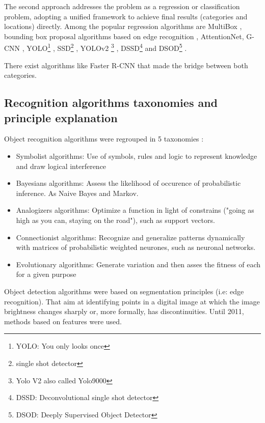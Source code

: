 \documentclass[10pt]{article}
\begin{document}
The second approach addresses the problem as a regression or classiﬁcation problem, adopting a uniﬁed framework to achieve ﬁnal results (categories and locations) directly. Among the popular regression algorithms are MultiBox \cite{erhan2014scalable}, bounding box proposal algorithms based on edge recognition \cite{zitnick2014edge}, AttentionNet\cite{yoo2015attentionnet}, G-CNN \cite{najibi2016g}, YOLO\footnote{YOLO: You only looks once} \cite{redmon2016you}, SSD\footnote{single shot detector} \cite{liu2016ssd}, YOLOv2 \footnote{Yolo V2 also called Yolo9000} \cite{redmon2017yolo9000}, DSSD\footnote{DSSD: Deconvolutional single shot detector} \cite{fu2017dssd} and DSOD\footnote{DSOD:  Deeply Supervised Object Detector} \cite{shen2017dsod}.

There exist algorithms like Faster R-CNN that made the bridge between both categories.

\subsection{Recognition algorithms taxonomies and principle explanation }

Object recognition algorithms were regrouped in 5 taxonomies \cite{domingos2015master}: 
\begin{itemize}
    \item Symbolist algorithms: Use of symbols, rules and logic to represent knowledge and draw logical interference 
    \item Bayesians algorithms: Assess the likelihood of occurence of probabilistic inference. As Naive Bayes and Markov. 
    \item Analogizers algorithms: Optimize a function in light of constrains ("going as high as you can, staying on the road"), such as support vectors.
    \item Connectionist algorithms: Recognize and generalize patterns dynamically with matrices of probabilistic weighted neurones, such as neuronal networks.
    \item Evolutionary algorithms: Generate variation and then asses the fitness of each for a given purpose
\end{itemize}

Object detection algorithms were based on segmentation principles (i.e: edge recognition).  That aim at identifying points in a digital image at which the image brightness changes sharply or, more formally, has discontinuities. Until 2011, methods based on features were used. \\ 
\end{document}
